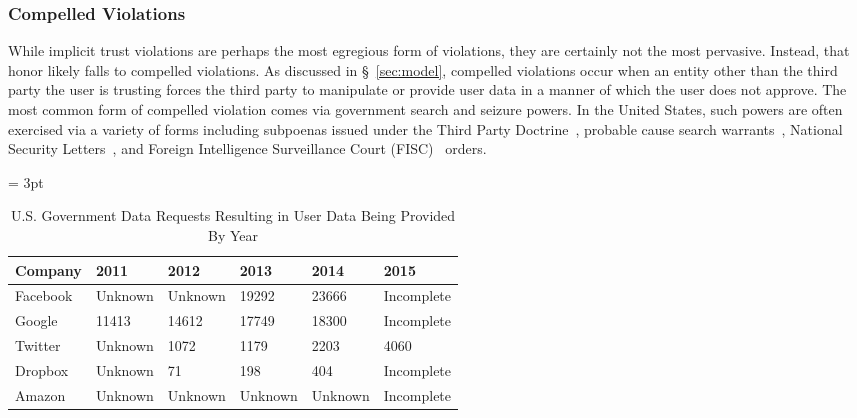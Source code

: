 \subsubsection{Compelled Violations}

While implicit trust violations are perhaps the most egregious form of
violations, they are certainly not the most pervasive. Instead, that
honor likely falls to compelled violations. As discussed in
\S~\ref{sec:model}, compelled violations occur when an entity other
than the third party the user is trusting forces the third party to
manipulate or provide user data in a manner of which the user does not
approve. The most common form of compelled violation comes via
government search and seizure powers. In the United States, such
powers are often exercised via a variety of forms including subpoenas
issued under the Third Party Doctrine~\cite{thompson-thirdparty},
probable cause search warrants~\cite{us-constitution-amend4}, National
Security Letters~\cite{fbi-nsl}, and Foreign Intelligence Surveillance
Court (FISC)~\cite{fisc} orders.

\begin{table}[thb]
  \footnotesize
  \centering
  \tabulinesep = 3pt
  \begin{tabu} to \textwidth
    { | X[2,c,m]
      | X[1,c,m]
      | X[1,c,m]
      | X[1,c,m]
      | X[1,c,m]
      | X[1,c,m]
      | }
    \hline
    \textbf{Company}
    & \textbf{2011}
    & \textbf{2012}
    & \textbf{2013}
    & \textbf{2014}
    & \textbf{2015}
    \\ \hline 
    Facebook
    & Unknown
    & Unknown
    & 19292
    & 23666
    & Incomplete
    \\ \hline
    Google
    & 11413
    & 14612
    & 17749
    & 18300
    & Incomplete
    \\ \hline
    Twitter
    & Unknown
    & 1072
    & 1179
    & 2203
    & 4060
    \\ \hline 
    Dropbox
    & Unknown
    & 71
    & 198
    & 404
    & Incomplete
    \\ \hline 
    Amazon
    & Unknown
    & Unknown
    & Unknown
    & Unknown
    & Incomplete
    \\ \hline 
 \end{tabu}
  \caption{ U.S. Government Data Requests Resulting in User Data Being
    Provided By Year }
  \label{tab:analysis:violations:reports}
\end{table}

